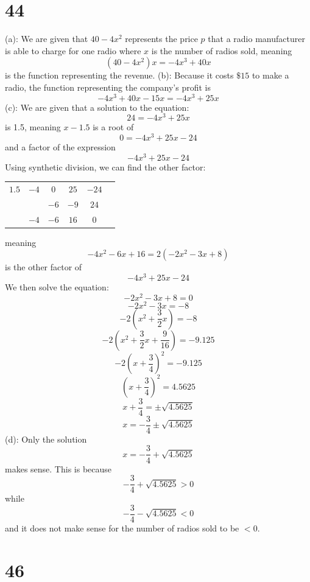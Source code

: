 \documentclass{article}
\theoremstyle{definition}
\begin{document}
\section*{44}
(a): We are given that $40-4x^2$ represents the price $p$ that a radio manufacturer is able to charge for one radio where $x$ is the number of radios sold, 
meaning \[ (40-4x^2)x=-4x^3+40x \] is the function representing the revenue.\newline
(b): Because it costs $\$15$ to make a radio, the function representing the company's profit is
\[ -4x^3+40x-15x=-4x^3+25x \]
\newline
(c): We are given that a solution to the equation:
\[ 24=-4x^3+25x \] is 1.5, meaning $x-1.5$ is a root of 
\[ 0=-4x^3+25x-24 \] and a factor of the expression \[ -4x^3+25x-24 \] Using synthetic division, we can find the other factor:
\FloatBarrier
	\begin{center}
		\begin{tabular}{l|ccccr}
			$1.5$ & $-4$ & $0$ & $25$ & $-24$ \\
			& & $-6$ & $-9$ & $24$ \\[-4.75pt]
			\cmidrule{2-5}
			& $-4$ & $-6$ & $16$ & $0$
		\end{tabular}
	\end{center}
\FloatBarrier
meaning \[ -4x^2-6x+16=2(-2x^2-3x+8) \] is the other factor of \[ -4x^3+25x-24 \] We then solve the equation:
\[ -2x^2-3x+8=0 \]
\[ -2x^2-3x=-8 \]
\[ -2(x^2+\frac{3}{2}x)=-8 \]
\[ -2(x^2+\frac{3}{2}x+\frac{9}{16})=-9.125 \]
\[ -2(x+\frac{3}{4})^2=-9.125 \]
\[ (x+\frac{3}{4})^2=4.5625 \]
\[ x+\frac{3}{4}=\pm\sqrt{4.5625} \]
\[x=-\frac{3}{4}\pm\sqrt{4.5625} \]
\newline
(d): Only the solution \[ x=-\frac{3}{4}+\sqrt{4.5625} \] makes sense. This is because \[ -\frac{3}{4}+\sqrt{4.5625}>0 \] while 
\[ -\frac{3}{4}-\sqrt{4.5625}<0 \] and it does not make sense for the number of radios sold to be $<0$.

\section*{46}
\end{document}
